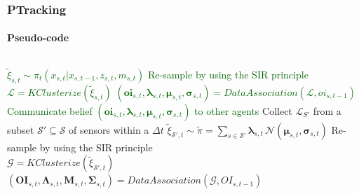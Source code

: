 \begin{frame}
	\frametitle{PTracking}
	\framesubtitle{Pseudo-code}
	
	\begin{columns}[T]
		
		
		{
			\begin{algorithm}[H]
				\tiny
				\BlankLine
				\BlankLine
				\BlankLine
				\Begin
				{
					\textcolor{darkgreen}{$ \tilde{\xi}_{s,t} \sim \pi_t (x_{s,t} | x_{s,t-1},z_{s,t},m_{s,t}) $}
					\BlankLine
					\textcolor{darkgreen}{Re-sample by using the SIR principle}\\
					\BlankLine
					\textcolor{darkgreen}{$ \mathcal{L} = KClusterize(\tilde{\xi}_{s,t}) $}
					\BlankLine
					\textcolor{darkgreen}{$ (\boldsymbol{oi}_{s,t},\boldsymbol\lambda_{s,t},\boldsymbol\mu_{s,t},\boldsymbol\sigma_{s,t}) = DataAssociation(\mathcal{L}, oi_{s,t-1}) $}
					\BlankLine
					\textcolor{darkgreen}{Communicate belief $ (\boldsymbol{oi}_{s,t},\boldsymbol\lambda_{s,t},\boldsymbol\mu_{s,t},\boldsymbol\sigma_{s,t}) $ to other agents}
				}
				\BlankLine
				\Begin
				{
					Collect $ \mathcal{L}_{S'} $ from a subset $ \mathcal{S'} \subseteq \mathcal{S} $ of
					sensors within a $ \Delta t $
					\BlankLine
					$ \tilde{\xi}_{\mathcal{S'},t} \sim \tilde\pi = \sum_{s \in \mathcal{S'}} \boldsymbol\lambda_{s,t} \, \mathcal{N} (\boldsymbol\mu_{s,t},\boldsymbol\sigma_{s,t}) $
					\BlankLine
					Re-sample by using the SIR principle\\
					\BlankLine
					$ \mathcal{G} = KClusterize(\tilde\xi_{{\mathcal{S'},t}}) $
					\BlankLine
					$ (\boldsymbol{OI}_{s,t},\boldsymbol\Lambda_{s,t},\boldsymbol{M}_{s,t},\boldsymbol\Sigma_{s,t}) = DataAssociation(\mathcal{G},OI_{s,t-1}) $
				}
			\end{algorithm}
			
			
			\Huge
			\vspace{2.15cm}
			
}
\end{columns}
\end{frame}
